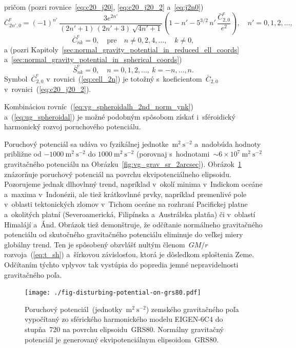 \documentclass[a4paper,12pt]{book}
\begin{document}
%
pričom (pozri rovnice~\ref{eq:c20_j20}, \ref{eq:c20_j20_2} a~\ref{eq:j2n0})
%
\begin{equation}
\label{eq:cell_2n}
\bar{C}^\mathrm{e}_{2n',0} = (-1)^{n'} \, \frac{3e^{2n'}}{(2n' + 1) \, (2n' 
+ 3) \, \sqrt{4n' + 1}} \left( 1 - n' - 5^{3 \slash 2} \, n' \, 
\frac{\bar{C}^\mathrm{e}_{2,0}}{e^2} \right){,} \quad n' = 0, 1, 2,\dots{,}
\end{equation}
%
\begin{equation}
\bar{C}^\mathrm{e}_{nk} = 0{,} \quad \textrm{pre} \quad n \neq 0, 2, 4,\dots, 
\quad k \neq 0{,}
\end{equation}
%
a (pozri Kapitoly~\ref{sec:normal_gravity_potential_in_reduced_ell_coords} 
a~\ref{sec:normal_gravity_potential_in_spherical_coords})
%
\begin{equation}
\bar{S}^\mathrm{e}_{nk} = 0{,} \quad n = 0, 1, 2,\dots, \ k = -n, \dots, n{.}
\end{equation}
%
Symbol~$\bar{C}^\mathrm{e}_{2,0}$ v~rovnici~(\ref{eq:cell_2n}) je totožný 
s~koeficientom~$\bar{C}_{2,0}$ v~rovnici~(\ref{eq:c20_j20_2}).

Kombináciou rovníc~(\ref{eq:vg_spheroidalh_2nd_norm_ynk}) 
a~(\ref{eq:ug_spheroidal}) je možné podobným spôsobom získať i~sféroidický 
harmonický rozvoj poruchového potenciálu.

Poruchový potenciál sa udáva vo fyzikálnej jednotke~$\mathrm{m}^2 
\ \mathrm{s}^{-2}$ a~nadobúda hodnoty približne od $-1000\ \mathrm{m}^2 
\ \mathrm{s}^{-2}$ do $1000 \ \mathrm{m}^2 \ \mathrm{s}^{-2}$ (porovnaj 
s~hodnotami~${\sim}6 \times 10^7\ \mathrm{m}^2 \ \mathrm{s}^{-2}$ gravitačného 
potenciálu na Obrázku~\ref{fig:vg_grav_sr_2arcsec}).  
Obrázok~\ref{fig:disturbing_potential_on_grs80} znázorňuje poruchový potenciál 
na povrchu ekvipotenciálneho elipsoidu.  Pozorujeme jednak dlhovlnný trend, 
napríklad v~okolí minima v~Indickom oceáne a~maxima v~Indonézii, ale tiež 
krátkovlnné prvky, napríklad premenlivé pole v~oblasti tektonických zlomov 
v~Tichom oceáne na rozhraní Pacifickej platne a~okolitých platní 
(Severoamerická, Filipínska a~Austrálska platňa) či v~oblastí Himalájí a~Ánd.  
Obrázok tiež demonštruje, že odčítanie normálneho gravitačného potenciálu od 
skutočného gravitačného potenciálu eliminuje do veľkej miery globálny trend.  
Ten je spôsobený obzvlášť nultým členom~$GM \slash r$ rozvoja~(\ref{eq:t_sh}) 
a~šírkovou závislosťou, ktorá je dôsledkom sploštenia Zeme.  Odčítaním týchto 
vplyvov tak vystúpia do popredia jemné nepravidelnosti gravitačného poľa.

\begin{figure}
\centering
\texttt{[image: ./fig-disturbing-potential-on-grs80.pdf]}
\caption{Poruchový potenciál~(jednotky~$\mathrm{m}^2 \ \mathrm{s}^{-2}$) 
zemského gravitačného poľa vypočítaný zo sférického harmonického modelu 
EIGEN-6C4 do stupňa~720 na povrchu elipsoidu~GRS80.  Normálny gravitačný 
potenciál je generovaný ekvipotenciálnym elipsoidom~GRS80.}
\label{fig:disturbing_potential_on_grs80}
\end{figure}
\end{document}
